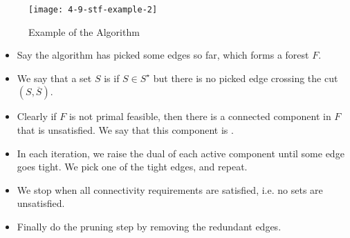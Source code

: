 \documentclass[../main/main.tex]{subfiles}
\begin{document}
\begin{figure}[h!]
	\centering
	\texttt{[image: 4-9-stf-example-2]}
	\caption{Example of the Algorithm}
\end{figure}
\begin{algo}

	\begin{itemize}
		\item Say the algorithm has picked some edges so far, which forms a forest $F$.
		\item We say that a set $S$ is  if $S\in S^{\star}$ but there is no picked edge crossing the cut $(S,\overline{S})$. 
		\item Clearly if $F$ is not primal feasible, then there is a connected component in $F$ that is unsatisfied. We say that this component is .
		\item In each iteration, we raise the dual of each active component until some edge goes tight. We pick one of the tight edges, and repeat.
		\item We stop when all connectivity requirements are satisfied, i.e. no sets are unsatisfied. 
		\item Finally do the pruning step by removing the redundant edges.
	\end{itemize}
\end{algo}
\end{document}
